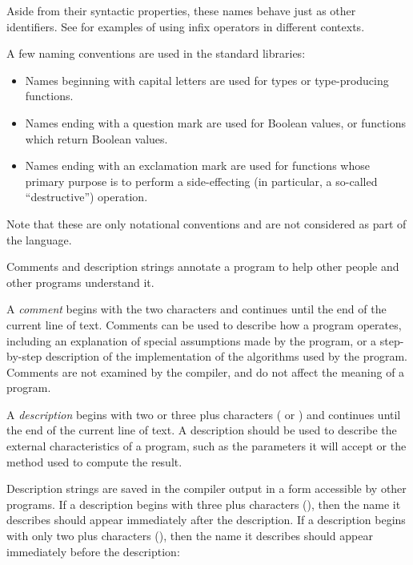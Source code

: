 Aside from their syntactic properties,
these names behave just as other identifiers.
See  for examples of using infix operators
in different contexts.

A few naming conventions are used in the standard libraries:

\begin{itemize}
\item 
  Names beginning with capital letters are used for types or
  type-producing functions.
\item
  Names ending with a question mark are used for Boolean values,
  or functions which return Boolean values.
\item
  Names ending with an exclamation mark are used for functions whose
  primary purpose is to perform a side-effecting (in particular, a
  so-called ``destructive'') operation.
\end{itemize}

Note that these are only notational conventions and are not considered
as part of the language.


Comments and description strings
annotate a program to help other people and other programs understand it.  

A {\em comment\/} begins with the two characters
\ttin{--} and continues until the end of the current
line of text. 
Comments can be used to describe how a program operates, including
an explanation of special assumptions made by the program, or a
step-by-step description of the implementation of the algorithms
used by the program.
Comments are not examined by the compiler, and do not affect the meaning
of a program.

A {\em description\/} begins with two or three plus characters
(\ttin{++} or \ttin{+++})
and continues until the end of the current line of text.
A description should be used to describe the external characteristics
of a program, such as the parameters it will accept or the method used
to compute the result.

Description strings are saved in the compiler output in a form
accessible by other programs.
If a description begins with three plus characters (\ttin{+++}),
then the name it describes should appear immediately after the description.
If a description begins with only two plus characters (\ttin{++}),
then the name it describes should appear immediately before the description:

